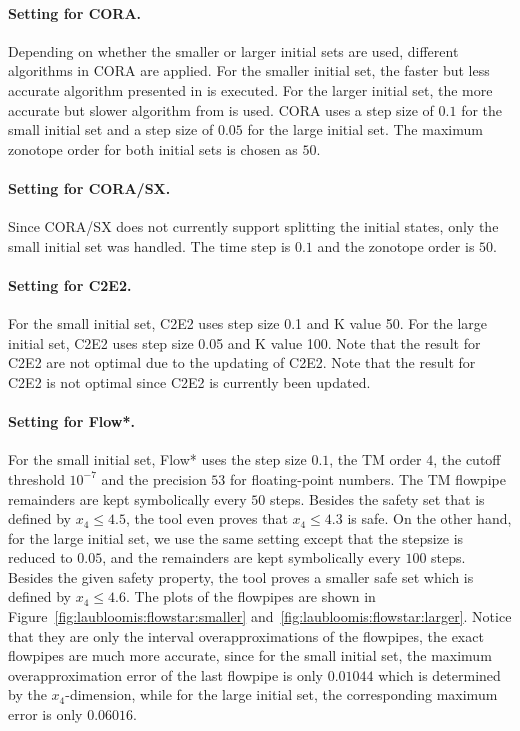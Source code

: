 \documentclass[EPiC]{easychair}
\begin{document}
\clearpage

\paragraph{Setting for CORA.}
Depending on whether the smaller or larger initial sets are used, different algorithms in CORA are applied. For the smaller initial set, the faster but less accurate algorithm presented in \cite{Althoff2008c} is executed. For the larger initial set, the more accurate but slower algorithm from \cite{Althoff2013a} is used. CORA uses a step size of $0.1$ for the small initial set and a step size of $0.05$ for the large initial set. The maximum zonotope order for both initial sets is chosen as $50$.

\paragraph{Setting for CORA/SX.}
Since CORA/SX does not currently support splitting the initial states, only the small initial set was handled. The time step is $0.1$ and the zonotope order is $50$.

\paragraph{Setting for C2E2.}
For the small initial set, C2E2 uses step size 0.1 and K value 50. For the large initial set, C2E2 uses step size 0.05 and K value 100. Note that the result for C2E2 are not optimal due to the updating of C2E2. Note that the result for C2E2 is not optimal since C2E2 is currently been updated.

\paragraph{Setting for Flow*.}
For the small initial set, Flow* uses the step size $0.1$, the TM order $4$, the cutoff threshold $10^{-7}$ and the precision $53$ for floating-point numbers. The TM flowpipe remainders are kept symbolically every $50$ steps. Besides the safety set that is defined by $x_4 \leq 4.5$, the tool even proves that $x_4 \leq 4.3$ is safe. On the other hand, for the large initial set, we use the same setting except that the stepsize is reduced to $0.05$, and the remainders are kept symbolically every $100$ steps. Besides the given safety property, the tool proves a smaller safe set which is defined by $x_4 \leq 4.6$. The plots of the flowpipes are shown in Figure~\ref{fig:laubloomis:flowstar:smaller} and~\ref{fig:laubloomis:flowstar:larger}. Notice that they are only the interval overapproximations of the flowpipes, the exact flowpipes are much more accurate, since for the small initial set, the maximum overapproximation error of the last flowpipe is only $0.01044$ which is determined by the $x_4$-dimension, while for the large initial set, the corresponding maximum error is only $0.06016$.
\end{document}
